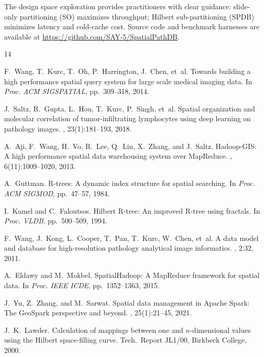\documentclass[10pt,twocolumn]{article}
\begin{document}
The design space exploration provides practitioners with clear guidance: slide-only partitioning (SO) maximizes throughput; Hilbert sub-partitioning (SPDB) minimizes latency and cold-cache cost.
Source code and benchmark harnesses are available at \url{https://github.com/SAY-5/SpatialPathDB}.


\begin{thebibliography}{14}

F.~Wang, T.~Kurc, T.~Oh, P.~Harrington, J.~Chen, et~al.
\newblock Towards building a high performance spatial query system for large scale medical imaging data.
\newblock In {\em Proc. ACM SIGSPATIAL}, pp.~309--318, 2014.

J.~Saltz, R.~Gupta, L.~Hou, T.~Kurc, P.~Singh, et~al.
\newblock Spatial organization and molecular correlation of tumor-infiltrating lymphocytes using deep learning on pathology images.
, 23(1):181--193, 2018.

A.~Aji, F.~Wang, H.~Vo, R.~Lee, Q.~Liu, X.~Zhang, and J.~Saltz.
\newblock Hadoop-GIS: A high performance spatial data warehousing system over MapReduce.
, 6(11):1009--1020, 2013.

A.~Guttman.
\newblock R-trees: A dynamic index structure for spatial searching.
\newblock In {\em Proc. ACM SIGMOD}, pp.~47--57, 1984.

I.~Kamel and C.~Faloutsos.
\newblock Hilbert R-tree: An improved R-tree using fractals.
\newblock In {\em Proc. VLDB}, pp.~500--509, 1994.

F.~Wang, J.~Kong, L.~Cooper, T.~Pan, T.~Kurc, W.~Chen, et~al.
\newblock A data model and database for high-resolution pathology analytical image informatics.
, 2:32, 2011.

A.~Eldawy and M.~Mokbel.
\newblock SpatialHadoop: A MapReduce framework for spatial data.
\newblock In {\em Proc. IEEE ICDE}, pp.~1352--1363, 2015.

J.~Yu, Z.~Zhang, and M.~Sarwat.
\newblock Spatial data management in Apache Spark: The GeoSpark perspective and beyond.
, 25(1):21--45, 2021.

J.~K.~Lawder.
\newblock Calculation of mappings between one and $n$-dimensional values using the Hilbert space-filling curve.
\newblock Tech.\ Report JL1/00, Birkbeck College, 2000.


\end{thebibliography}
\end{document}
